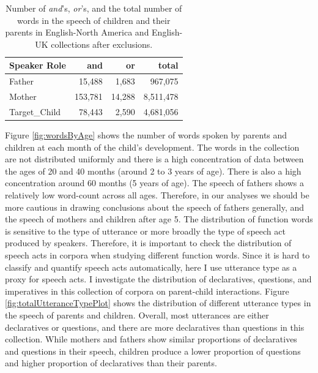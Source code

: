 \documentclass[,man,floatsintext]{apa6}
\begin{document}
\begin{table}[t]

\caption{\label{tab:countTable}Number of \textit{and}'s, \textit{or}'s, and the total number of words in the speech of children and their parents in English-North America and English-UK collections after exclusions.}
\centering
\begin{tabular}{l|r|r|r}
\hline
Speaker Role & and & or & total\\
\hline
Father & 15,488 & 1,683 & 967,075\\
\hline
Mother & 153,781 & 14,288 & 8,511,478\\
\hline
Target\_Child & 78,443 & 2,590 & 4,681,056\\
\hline
\end{tabular}
\end{table}

Figure \ref{fig:wordsByAge} shows the number of words spoken by parents and children at each month of the child's development. The words in the collection are not distributed uniformly and there is a high concentration of data between the ages of 20 and 40 months (around 2 to 3 years of age). There is also a high concentration around 60 months (5 years of age). The speech of fathers shows a relatively low word-count across all ages. Therefore, in our analyses we should be more cautious in drawing conclusions about the speech of fathers generally, and the speech of mothers and children after age 5.
The distribution of function words is sensitive to the type of utterance or more broadly the type of speech act produced by speakers. Therefore, it is important to check the distribution of speech acts in corpora when studying different function words. Since it is hard to classify and quantify speech acts automatically, here I use utterance type as a proxy for speech acts. I investigate the distribution of declaratives, questions, and imperatives in this collection of corpora on parent-child interactions. Figure \ref{fig:totalUtteranceTypePlot} shows the distribution of different utterance types in the speech of parents and children. Overall, most utterances are either declaratives or questions, and there are more declaratives than questions in this collection. While mothers and fathers show similar proportions of declaratives and questions in their speech, children produce a lower proportion of questions and higher proportion of declaratives than their parents.
\end{document}
